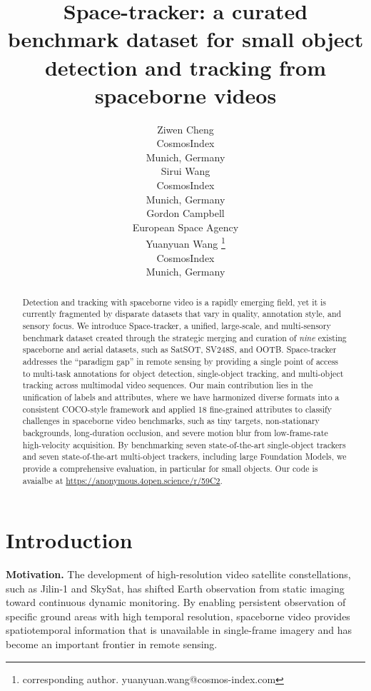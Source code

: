 \documentclass{article}
\title{Space-tracker: a curated benchmark dataset for small object detection and tracking from spaceborne videos}
\author{%
Ziwen Cheng \\ CosmosIndex\\ Munich, Germany\\
   \And
Sirui Wang \\ CosmosIndex \\ Munich, Germany\\
  \And
Gordon Campbell \\ European Space Agency\\
   \And
Yuanyuan Wang \thanks{corresponding author. yuanyuan.wang@cosmos-index.com}\\
CosmosIndex \\ Munich, Germany\\ }
\begin{document}
\maketitle


\begin{abstract}
Detection and tracking with spaceborne video is a rapidly emerging field, yet it is
currently fragmented by disparate datasets that vary in quality, annotation
style, and sensory focus. We introduce Space-tracker, a unified, large-scale,
and multi-sensory benchmark dataset created through the strategic merging and
curation of \textit{nine} existing spaceborne and aerial datasets, such as SatSOT,
SV248S, and OOTB. Space-tracker addresses the ``paradigm gap'' in remote sensing
by providing a single point of access to multi-task annotations for object detection, single-object tracking, and multi-object tracking across multimodal video sequences. Our main contribution lies in the unification of labels and attributes, where we have harmonized diverse formats into a consistent COCO-style framework and applied 18 fine-grained attributes to classify challenges in spaceborne video benchmarks, such as tiny targets, non-stationary backgrounds, long-duration occlusion, and severe motion blur from low-frame-rate high-velocity acquisition. By benchmarking seven state-of-the-art single-object trackers and seven state-of-the-art multi-object trackers, including large Foundation Models, we provide a comprehensive evaluation, in particular for small objects. Our code is avaialbe at \url{https://anonymous.4open.science/r/59C2}.
\end{abstract}


\section{Introduction}
\label{sec:introduction}
\noindent\textbf{Motivation.}
The development of high-resolution video satellite constellations, such as Jilin-1 and SkySat, has shifted Earth observation from static imaging toward continuous dynamic monitoring. By enabling persistent observation of specific ground areas with high temporal resolution, spaceborne video provides spatiotemporal information that is unavailable in single-frame imagery and has become an important frontier in remote sensing.
\end{document}
